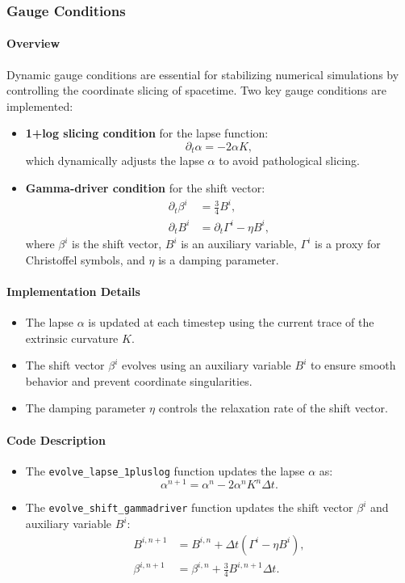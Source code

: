 \documentclass[12pt]{article}
\begin{document}
\subsubsection{Gauge Conditions}

\paragraph{Overview}
Dynamic gauge conditions are essential for stabilizing numerical simulations by controlling the coordinate slicing of spacetime. Two key gauge conditions are implemented:
\begin{itemize}
    \item \textbf{1+log slicing condition} for the lapse function:
    \[
    \partial_t \alpha = -2 \alpha K,
    \]
    which dynamically adjusts the lapse $\alpha$ to avoid pathological slicing.
    \item \textbf{Gamma-driver condition} for the shift vector:
    \begin{align*}
    \partial_t \beta^i &= \frac{3}{4} B^i, \\
    \partial_t B^i &= \partial_t \Gamma^i - \eta B^i,
    \end{align*}
    where $\beta^i$ is the shift vector, $B^i$ is an auxiliary variable, $\Gamma^i$ is a proxy for Christoffel symbols, and $\eta$ is a damping parameter.
\end{itemize}

\paragraph{Implementation Details}
\begin{itemize}
    \item The lapse $\alpha$ is updated at each timestep using the current trace of the extrinsic curvature $K$.
    \item The shift vector $\beta^i$ evolves using an auxiliary variable $B^i$ to ensure smooth behavior and prevent coordinate singularities.
    \item The damping parameter $\eta$ controls the relaxation rate of the shift vector.
\end{itemize}

\paragraph{Code Description}
\begin{itemize}
    \item The \texttt{evolve\_lapse\_1pluslog} function updates the lapse $\alpha$ as:
    \[
    \alpha^{n+1} = \alpha^n - 2 \alpha^n K^n \Delta t.
    \]
    \item The \texttt{evolve\_shift\_gammadriver} function updates the shift vector $\beta^i$ and auxiliary variable $B^i$:
    \begin{align*}
    B^{i,n+1} &= B^{i,n} + \Delta t \left(\Gamma^i - \eta B^i\right), \\
    \beta^{i,n+1} &= \beta^{i,n} + \frac{3}{4} B^{i,n+1} \Delta t.
    \end{align*}
\end{itemize}
\end{document}
